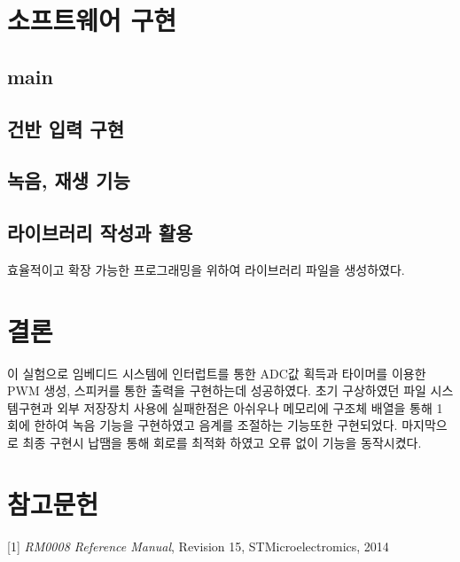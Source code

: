 \documentclass[a4paper,11pt]{article}
\begin{document}
\begin{spacing}{1.6}
\section{소프트웨어 구현}
 \subsection{main}

 \subsection{건반 입력 구현}
 \subsection{녹음, 재생 기능}
 
\subsection{라이브러리 작성과 활용}
 효율적이고 확장 가능한 프로그래밍을 위하여 라이브러리 파일을 생성하였다.
 

\section{결론}
   이 실험으로 임베디드 시스템에 인터럽트를 통한 ADC값 획득과 타이머를 이용한 PWM 생성, 스피커를 통한 출력을 구현하는데 성공하였다. 초기 구상하였던 파일 시스템구현과 외부 저장장치 사용에 실패한점은 아쉬우나 메모리에 구조체 배열을 통해 1회에 한하여 녹음 기능을 구현하였고 음계를 조절하는 기능또한 구현되었다. 마지막으로 최종 구현시 납땜을 통해 회로를 최적화 하였고 오류 없이 기능을 동작시켰다.

\section*{참고문헌}
[1] \textit{RM0008 Reference Manual}, Revision 15, STMicroelectromics, 2014

\end{spacing}
\end{document}
